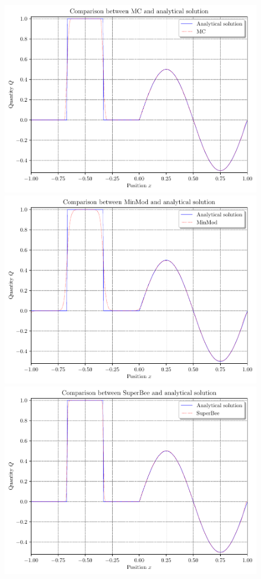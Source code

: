 \begin{figure}[ht!]
	\includegraphics[width=.28\paperwidth]{graphics/MC}
	\includegraphics[width=.28\paperwidth]{graphics/MinMod}
	\includegraphics[width=.28\paperwidth]{graphics/SuperBee}

\end{figure}
